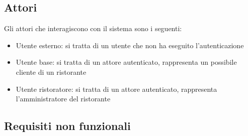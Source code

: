 \subsection{Attori}
Gli attori che interagiscono con il sistema sono i seguenti:
\begin{itemize}
    \item Utente esterno: si tratta di un utente che non ha eseguito l'autenticazione
    \item Utente base: si tratta di un attore autenticato, rappresenta un possibile cliente di un ristorante
    \item Utente ristoratore: si tratta di un attore autenticato, rappresenta l'amministratore del ristorante
\end{itemize}



\subsection{Requisiti non funzionali}

